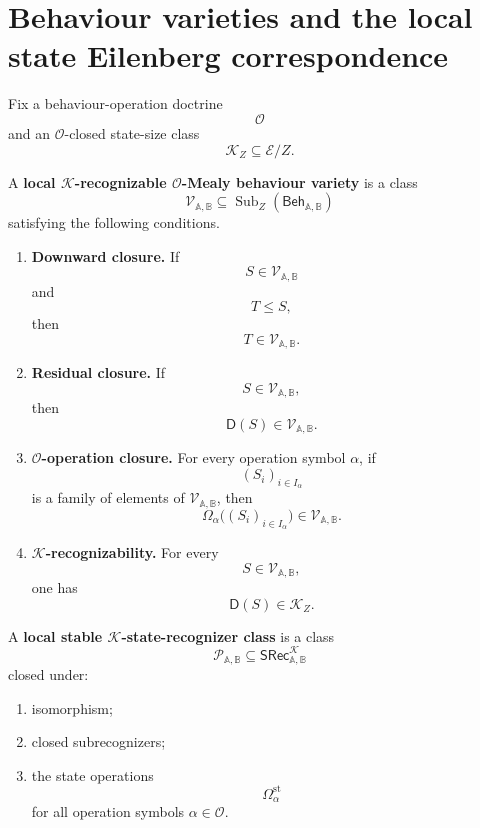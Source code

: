 \section{Behaviour varieties and the local state Eilenberg correspondence}
\label{sec:eilenberg-behaviour-varieties-state-correspondence}

Fix a behaviour-operation doctrine
\[
\mathcal O
\]
and an \(\mathcal O\)-closed state-size class
\[
\mathcal K_Z\subseteq \mathcal E/Z.
\]

\begin{definition}
\label{def:eilenberg-local-behaviour-variety}
A \textbf{local \(\mathcal K\)-recognizable \(\mathcal O\)-Mealy behaviour
variety} is a class
\[
\mathcal V_{\mathbb A,\mathbb B}
\subseteq
\operatorname{Sub}_Z(\mathsf{Beh}_{\mathbb A,\mathbb B})
\]
satisfying the following conditions.

\begin{enumerate}
\item \textbf{Downward closure.} If
\[
S\in\mathcal V_{\mathbb A,\mathbb B}
\]
and
\[
T\leq S,
\]
then
\[
T\in\mathcal V_{\mathbb A,\mathbb B}.
\]

\item \textbf{Residual closure.} If
\[
S\in\mathcal V_{\mathbb A,\mathbb B},
\]
then
\[
\mathsf D(S)\in\mathcal V_{\mathbb A,\mathbb B}.
\]

\item \textbf{\(\mathcal O\)-operation closure.} For every operation symbol
\(\alpha\), if
\[
(S_i)_{i\in I_\alpha}
\]
is a family of elements of \(\mathcal V_{\mathbb A,\mathbb B}\), then
\[
\Omega_\alpha\bigl((S_i)_{i\in I_\alpha}\bigr)
\in
\mathcal V_{\mathbb A,\mathbb B}.
\]

\item \textbf{\(\mathcal K\)-recognizability.} For every
\[
S\in\mathcal V_{\mathbb A,\mathbb B},
\]
one has
\[
\mathsf D(S)\in\mathcal K_Z.
\]
\end{enumerate}
\end{definition}

\begin{definition}
\label{def:eilenberg-stable-state-recognizer-class}
A \textbf{local stable \(\mathcal K\)-state-recognizer class} is a class
\[
\mathcal P_{\mathbb A,\mathbb B}
\subseteq
\mathsf{SRec}^{\mathcal K}_{\mathbb A,\mathbb B}
\]
closed under:
\begin{enumerate}
\item isomorphism;
\item closed subrecognizers;
\item the state operations
\[
\Omega_\alpha^{\mathrm{st}}
\]
for all operation symbols \(\alpha\in\mathcal O\).
\end{enumerate}
\end{definition}

